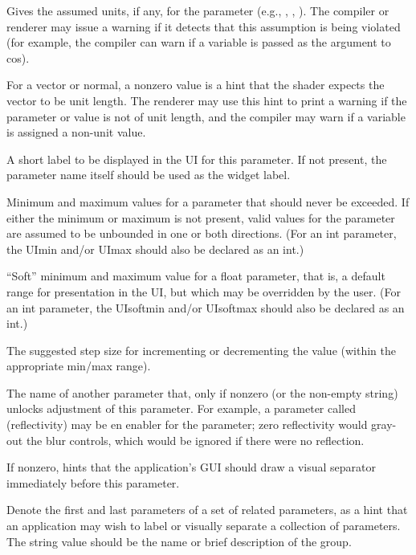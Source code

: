 \documentclass[11pt,letterpaper]{book}
\def\float{{\cf float}\xspace}
\def\normal{{\cf normal}\xspace}
\def\vector{{\cf vector}\xspace}
\begin{document}
Gives the assumed units, if any, for the parameter (e.g., ,
, ).
The compiler or renderer may issue a warning if it detects that this
assumption is being violated (for example, the compiler can warn
if a  variable is passed as the argument to {\cf cos}).
\apiend

For a \vector or \normal, a nonzero value is a hint that the shader
expects the vector to be unit length.  The renderer may use this hint to
print a warning if the parameter or value is not of unit length, and the
compiler may warn if a  variable is assigned a non-unit
value.
\apiend

A short label to be displayed in the UI for this parameter.  If not
present, the parameter name itself should be used as the widget label.
\apiend

Minimum and maximum values for a parameter that should never be
exceeded.  If either the minimum or maximum is not present, valid values
for the parameter are assumed to be unbounded in one or both directions.
(For an {\cf int} parameter, the {\cf UImin} and/or {\cf UImax} should
also be declared as an {\cf int}.)
\apiend

``Soft'' minimum and maximum value for a \float parameter, that is, a
default range for presentation in the UI, but which may be overridden by
the user. (For an {\cf int} parameter, the {\cf UIsoftmin} and/or {\cf
  UIsoftmax} should also be declared as an {\cf int}.)
\apiend

The suggested step size for incrementing or decrementing the value
(within the appropriate min/max range).
\apiend

The name of another parameter that, only if nonzero (or the
non-empty string) unlocks adjustment of this parameter.  For example,
a parameter called  (reflectivity) may be en enabler for
the  parameter; zero reflectivity would gray-out
the blur controls, which would be ignored if there were no reflection.
\apiend

If nonzero, hints that the application's GUI should draw a visual 
separator immediately before this parameter.
\apiend

Denote the first and last parameters of a set of related parameters, as a
hint that an application may wish to label or visually separate a
collection of parameters.  The string value should be the name or brief
description of the group.
\apiend
\end{document}
